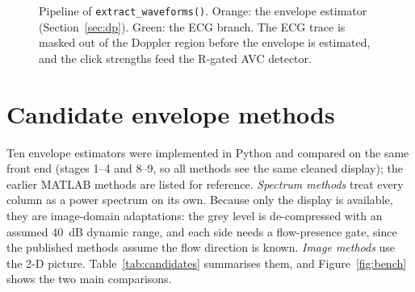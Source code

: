 \documentclass[10pt,a4paper]{article}
\newcommand{\code}[1]{\texttt{\small #1}}
\begin{document}
\begin{figure}[h]
\caption{Pipeline of \code{extract\_waveforms()}. Orange: the envelope estimator (Section~\ref{sec:dp}).
Green: the ECG branch. The ECG trace is masked out of the Doppler region before the envelope is estimated, and
the click strengths feed the R-gated AVC detector.}
\label{fig:pipeline}
\end{figure}

\section{Candidate envelope methods}
\label{sec:candidates}
Ten envelope estimators were implemented in Python and compared on the same front end (stages 1--4 and 8--9, so all methods
see the same cleaned display); the earlier MATLAB methods are listed for reference. \emph{Spectrum methods} treat every column as a power spectrum on its own. Because only the display
is available, they are image-domain adaptations: the grey level is de-compressed with an assumed 40~dB dynamic
range, and each side needs a flow-presence gate, since the published methods assume the flow direction is known.
\emph{Image methods} use the 2-D picture. Table~\ref{tab:candidates} summarises them, and Figure~\ref{fig:bench}
shows the two main comparisons.
\end{document}
